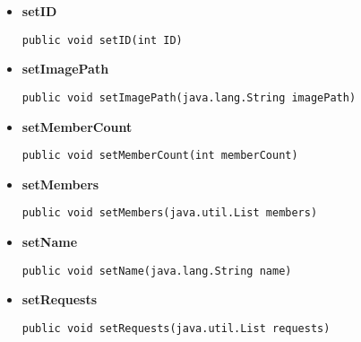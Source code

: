\documentclass[11pt,a4paper]{report}
\begin{document}
{{{{{{\begin{itemize}
{
\hypertarget{edu.kit.pse17.go_app.PersistenceLayer.GroupEntity.setDescription(java.lang.String)}{{\bf  setDescription}\\}
\begin{lstlisting}[frame=none]
public void setDescription(java.lang.String description)\end{lstlisting} %
}%
\item{ 
\hypertarget{edu.kit.pse17.go_app.PersistenceLayer.GroupEntity.setID(int)}{{\bf  setID}\\}
\begin{lstlisting}[frame=none]
public void setID(int ID)\end{lstlisting} %
}%
\item{ 
\hypertarget{edu.kit.pse17.go_app.PersistenceLayer.GroupEntity.setImagePath(java.lang.String)}{{\bf  setImagePath}\\}
\begin{lstlisting}[frame=none]
public void setImagePath(java.lang.String imagePath)\end{lstlisting} %
}%
\item{ 
\hypertarget{edu.kit.pse17.go_app.PersistenceLayer.GroupEntity.setMemberCount(int)}{{\bf  setMemberCount}\\}
\begin{lstlisting}[frame=none]
public void setMemberCount(int memberCount)\end{lstlisting} %
}%
\item{ 
\hypertarget{edu.kit.pse17.go_app.PersistenceLayer.GroupEntity.setMembers(java.util.List)}{{\bf  setMembers}\\}
\begin{lstlisting}[frame=none]
public void setMembers(java.util.List members)\end{lstlisting} %
}%
\item{ 
\hypertarget{edu.kit.pse17.go_app.PersistenceLayer.GroupEntity.setName(java.lang.String)}{{\bf  setName}\\}
\begin{lstlisting}[frame=none]
public void setName(java.lang.String name)\end{lstlisting} %
}%
\item{ 
\hypertarget{edu.kit.pse17.go_app.PersistenceLayer.GroupEntity.setRequests(java.util.List)}{{\bf  setRequests}\\}
\begin{lstlisting}[frame=none]
public void setRequests(java.util.List requests)\end{lstlisting} %
}%
\end{itemize}
}
}
}}}}
\end{document}

